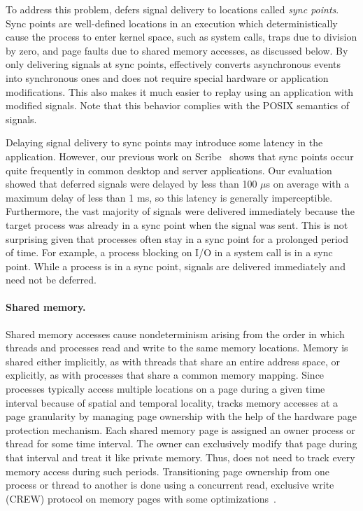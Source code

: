 To address this problem, {\dora} defers signal delivery to
locations called
\emph{sync points}.  Sync points are well-defined locations in an
execution which deterministically cause the process
to enter kernel space, such as system calls, traps due to division by
zero, and page faults due to shared memory accesses, as discussed
below.  By
only delivering signals at sync points,
{\dora} effectively converts asynchronous events into
synchronous ones and does not require special hardware or application
modifications. This also makes it much easier to replay using an application with
modified signals.
Note that this behavior complies with the POSIX
semantics of signals.

Delaying signal delivery to sync points may introduce some latency in
the application. However,
our previous work on Scribe~\cite{scribe:sigmetrics10} shows that
sync points occur quite frequently in common desktop and server
applications. Our evaluation showed that deferred signals were delayed by
less than 100 $\mu$s on average with a maximum delay of less than 1
ms, so this latency is generally imperceptible.  Furthermore, the vast
majority of signals were delivered immediately
because the target process was
already in a sync point when the signal was sent. This is
not surprising given that processes often stay in a sync point for a
prolonged period of time. For example, a process blocking on I/O in a system
call is in a sync point.
While a process is in a sync point, signals are delivered
immediately and need not be deferred.

\paragraph{Shared memory.}
Shared memory accesses cause nondeterminism arising from the order in
which threads and processes read and write to the same memory locations.
Memory is shared either implicitly, as with threads that share an
entire address space, or explicitly, as with processes that share a common
memory mapping.  Since processes typically access multiple locations
on a page during a given time interval because of spatial and temporal
locality, {\dora} tracks memory accesses at a page granularity
by managing page ownership with the help of the hardware page protection mechanism.
Each shared memory page is assigned an owner process or thread for
some time interval. The owner can exclusively modify that page during
that interval and treat it like private memory. Thus, {\dora} does not need
to track every memory access during such
periods. Transitioning page ownership from one process or thread to
another is done using a concurrent read, exclusive write (CREW)
protocol on memory pages with some optimizations~\cite{scribe:sigmetrics10}.


